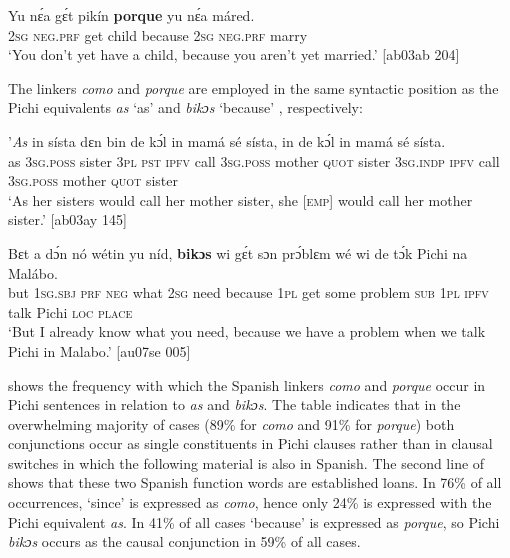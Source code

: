 \ea%
    \label{ex:key:1724}
    \gll Yu  nɛ́a    gɛ́t  pikín  \textbf{porque}  yu  nɛ́a    máred.\\
\textsc{2sg}  \textsc{neg}.\textsc{prf}  get  child  because  \textsc{2sg}  \textsc{neg}.\textsc{prf}  marry\\

\glt ‘You don’t yet have a child, because you aren’t yet married.’ [ab03ab 204] 
\z

The linkers \textit{como} and \textit{porque} are employed in the same syntactic position as the Pichi equivalents \textit{as} ‘as’  and \textit{bikɔs} ‘because’ , respectively: 


\ea%
    \label{ex:key:1725}
    \gll '\textit{As}  in    sísta    dɛn  bin  de  kɔ́l  in    mamá  sé
sísta,  in    de  kɔ́l  in    mamá  sé    sísta.\\
as  \textsc{3sg.poss}  sister  \textsc{3pl}  \textsc{pst}  \textsc{ipfv}  call  \textsc{3sg.poss}  mother  \textsc{quot}
sister  \textsc{3sg.indp}  \textsc{ipfv}  call  \textsc{3sg.poss}  mother  \textsc{quot}    sister\\

\glt ‘As her sisters would call her mother sister, she \textsc{[emp]} would 
call her mother sister.’ [ab03ay 145]
\z


\ea%
    \label{ex:key:1726}
    \gll Bɛt  a    dɔ́n  nó  wétin  yu  níd,  \textbf{bikɔs}  wi  gɛ́t  sɔn
prɔ́blɛm  wé  wi  de  tɔ́k  Pichi  na  Malábo.\\
but  \textsc{1sg.sbj}  \textsc{prf}  \textsc{neg}  what  \textsc{2sg}  need  because  \textsc{1pl}  get  some
problem  \textsc{sub}  \textsc{1pl}  \textsc{ipfv}  talk  Pichi  \textsc{loc}  \textsc{place}\\

\glt ‘But I already know what you need, because we have a problem when 
we talk Pichi in Malabo.’ [au07se 005]
\z

 shows the frequency with which the Spanish linkers \textit{como} and \textit{porque} occur in Pichi sentences in relation to \textit{as} and \textit{bikɔs}. The table indicates that in the overwhelming majority of cases (89\% for \textit{como} and 91\% for \textit{porque}) both conjunctions occur as single constituents in Pichi clauses rather than in clausal switches in which the following material is also in Spanish. The second line of  shows that these two Spanish function words are established loans. In 76\% of all occurrences, ‘since’ is expressed as \textit{como}, hence only 24\% is expressed with the Pichi equivalent \textit{as}. In 41\% of all cases ‘because’ is expressed as \textit{porque}, so Pichi \textit{bikɔs} occurs as the causal conjunction in 59\% of all cases.

